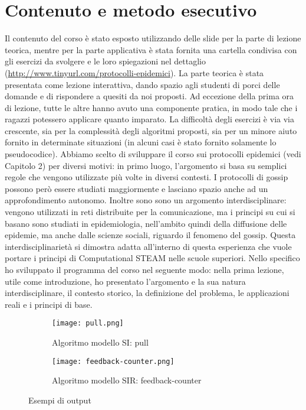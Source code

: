 \section{Contenuto e metodo esecutivo} 
Il contenuto del corso è stato esposto utilizzando delle slide per la parte di lezione teorica, mentre per la parte applicativa è stata fornita una cartella condivisa con gli esercizi da svolgere e le loro spiegazioni nel dettaglio (\href{http://www.tinyurl.com/protocolli-epidemici}{http://www.tinyurl.com/protocolli-epidemici}). La parte teorica è stata presentata come lezione interattiva, dando spazio agli studenti di porci delle domande e di rispondere a quesiti da noi proposti. Ad eccezione della prima ora di lezione, tutte le altre hanno avuto una componente pratica, in modo tale che i ragazzi potessero applicare quanto imparato. La difficoltà degli esercizi è via via crescente, sia per la complessità degli algoritmi proposti, sia per un minore aiuto fornito in determinate situazioni (in alcuni casi è stato fornito solamente lo pseudocodice). 
Abbiamo scelto di sviluppare il corso sui protocolli epidemici (vedi Capitolo 2) per diversi motivi: in primo luogo, l’argomento si basa su semplici regole che vengono utilizzate più volte in diversi contesti. I protocolli di gossip possono però essere studiati maggiormente e lasciano spazio anche ad un approfondimento autonomo. Inoltre sono sono un argomento interdisciplinare: vengono utilizzati in reti distribuite per la comunicazione, ma i principi su cui si basano sono studiati in epidemiologia, nell’ambito quindi della diffusione delle epidemie, ma anche dalle scienze sociali, riguardo il fenomeno del gossip. Questa interdisciplinarietà si dimostra adatta all’interno di questa esperienza che vuole portare i principi di Computational STEAM nelle scuole superiori.
Nello specifico ho sviluppato il programma del corso nel seguente modo: nella prima lezione, utile come introduzione, ho presentato l’argomento e la sua natura interdisciplinare, il contesto storico, la definizione del problema, le applicazioni reali e i principi di base.
\begin{figure}[!h]
    
    \begin{subfigure}{.5\textwidth}
        \centering
        \texttt{[image: pull.png]}
        \captionsetup{justification=centering}
        \caption{Algoritmo modello SI: pull} 
    \end{subfigure}\hfill
    \begin{subfigure}{.5\textwidth}
        \centering
        \texttt{[image: feedback-counter.png]}
        \captionsetup{justification=centering}
        \caption{Algoritmo modello SIR: feedback-counter} 
    \end{subfigure}
    \caption{Esempi di output}
    \label{fig:output}
\end{figure} 
